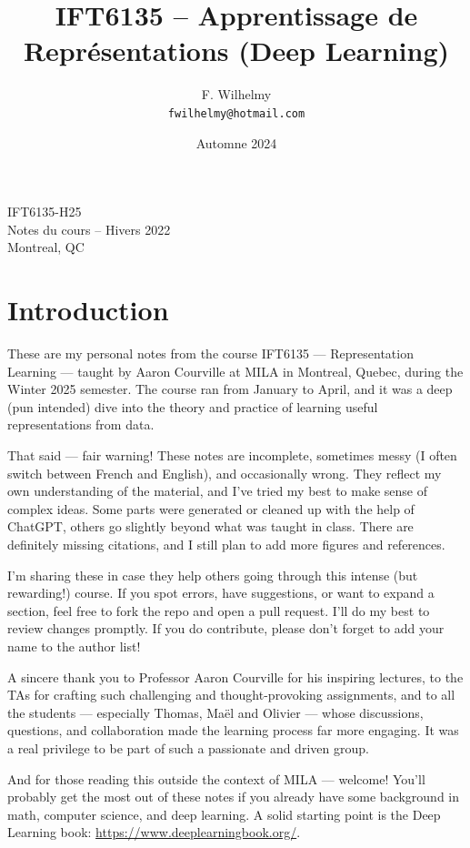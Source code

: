 \documentclass{article}
\title{IFT6135 -- Apprentissage de Représentations (Deep Learning)}
\author{F. Wilhelmy \\
    \texttt{fwilhelmy@hotmail.com}}
\date{Automne 2024}
\begin{document}
\maketitle

\begin{center}
    \huge IFT6135-H25 \\
    \Large Notes du cours -- Hivers 2022 \\
    \vspace{1cm}
    Montreal, QC \\
    \vspace{1cm}
\end{center}
\newpage
\section*{Introduction}
These are my personal notes from the course IFT6135 — Representation Learning — taught by Aaron Courville at MILA in Montreal, Quebec, during the Winter 2025 semester. The course ran from January to April, and it was a deep (pun intended) dive into the theory and practice of learning useful representations from data.

That said — fair warning! These notes are incomplete, sometimes messy (I often switch between French and English), and occasionally wrong. They reflect my own understanding of the material, and I’ve tried my best to make sense of complex ideas. Some parts were generated or cleaned up with the help of ChatGPT, others go slightly beyond what was taught in class. There are definitely missing citations, and I still plan to add more figures and references.

I’m sharing these in case they help others going through this intense (but rewarding!) course. If you spot errors, have suggestions, or want to expand a section, feel free to fork the repo and open a pull request. I’ll do my best to review changes promptly. If you do contribute, please don’t forget to add your name to the author list!

A sincere thank you to Professor Aaron Courville for his inspiring lectures, to the TAs for crafting such challenging and thought-provoking assignments, and to all the students — especially Thomas, Maël and Olivier — whose discussions, questions, and collaboration made the learning process far more engaging. It was a real privilege to be part of such a passionate and driven group.

And for those reading this outside the context of MILA — welcome! You’ll probably get the most out of these notes if you already have some background in math, computer science, and deep learning. A solid starting point is the Deep Learning book: \url{https://www.deeplearningbook.org/}.
\end{document}
